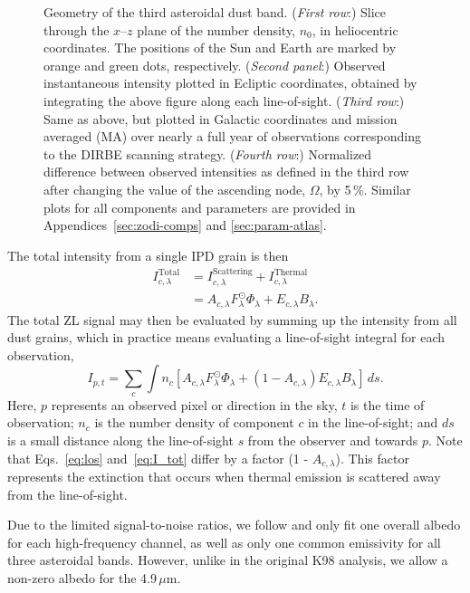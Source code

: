 \documentclass[twocolumn]{aa}
\begin{document}
\begin{figure}
  \caption{Geometry of the third asteroidal dust band. (\textit{First row}:)
    Slice through the $x$--$z$ plane of the number density, $n_{0}$,
    in heliocentric coordinates. The positions of the Sun and Earth
    are marked by orange and green dots, respectively. (\textit{Second
    panel}:) Observed instantaneous intensity plotted in Ecliptic
    coordinates, obtained by integrating the above figure along each
    line-of-sight. (\textit{Third row}:) Same as above, but plotted in
  Galactic coordinates and mission averaged (MA) over nearly a full year of
  observations corresponding to the DIRBE scanning strategy. 
  (\textit{Fourth row}:) Normalized difference between observed
  intensities as defined in the third row after changing the value of
  the ascending node, $\Omega$, by 5\,\%. Similar plots for all
  components and parameters are provided in 
  Appendices~\ref{sec:zodi-comps} and \ref{sec:param-atlas}.}
  \label{fig:band3}
\end{figure}

The total intensity from a single IPD grain is then
\begin{align}\label{eq:I_tot}
    I^\mathrm{Total}_{c, \lambda} &= I^\mathrm{Scattering}_{c,\lambda} + I^\mathrm{Thermal}_{c,\lambda}\\
    &= A_{c, \lambda} F_\lambda^\odot \Phi_\lambda + E_{c,\lambda} B_\lambda.
\end{align}
The total ZL signal may then be evaluated by summing up the intensity
from all dust grains, which in practice means evaluating a line-of-sight 
integral for each observation,
\begin{equation}\label{eq:los}
    I_{p,t} = \sum_c \int n_c \left[  A_{c, \lambda} F_\lambda^\odot \Phi_\lambda + \left( 1 - A_{c, \lambda} \right) E_{c,\lambda} B_\lambda \right]\,ds.
\end{equation}
Here, $p$ represents an observed pixel or direction in the sky, $t$ is
the time of observation; $n_c$ is the number density of component $c$
in the line-of-sight; and $ds$ is a small distance along the
line-of-sight $s$ from the observer and towards $p$. Note that
Eqs.~\eqref{eq:los} and~\eqref{eq:I_tot} differ by a factor (1 -
$A_{c, \lambda}$). This factor represents the extinction that occurs
when thermal emission is scattered away from the line-of-sight.

Due to the limited signal-to-noise ratios, we follow
\citet{Kelsall1998} and only fit one overall albedo for each
high-frequency channel, as well as only one common emissivity for all
three asteroidal bands. However, unlike in the original K98 analysis,
we allow a non-zero albedo for the 4.9\,$\mu$m.
\end{document}
